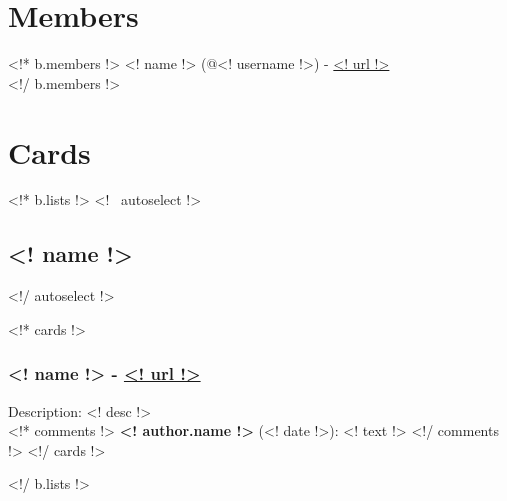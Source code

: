 



\renewcommand{\currentchapter}{<! b.title !>}
\renewcommand{\today}{<!* b.desc !><! b.desc !><!/ b.desc !><!~ b.desc !>Created by Trello2LaTeX<!/ b.desc !>}
\renewcommand{\currentpart}{Revision <! b.lastmodified !>}

\section{Members}
<!* b.members !>
<! name !> (@<! username !>) - \url{<! url !>}\\
<!/ b.members !>

\section{Cards}
<!* b.lists !>
<!~ autoselect !>\subsection{<! name !>}<!/ autoselect !>

<!* cards !>
\subsubsection{<! name !> - \url{<! url !>}}
Description: <! desc !>\\
<!* comments !>
{\bf <! author.name !>} (<! date !>): <! text !>
<!/ comments !>
<!/ cards !>

<!/ b.lists !>


